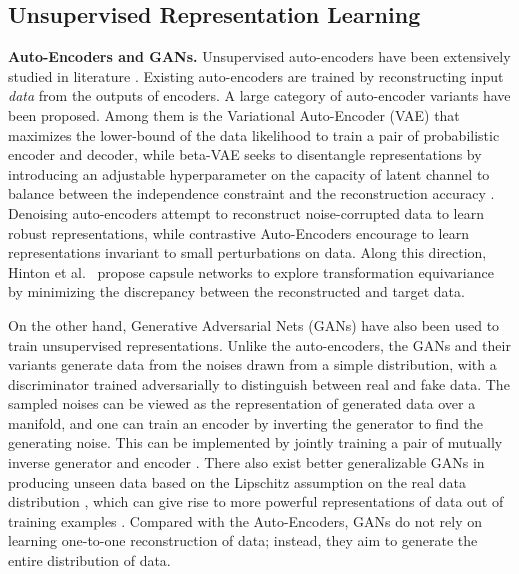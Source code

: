 \documentclass[10pt,journal,compsoc,twoside]{IEEEtran}
\begin{document}
\subsection{Unsupervised Representation Learning}
{\noindent \bf Auto-Encoders and GANs.}
Unsupervised auto-encoders have been extensively studied in literature \cite{hinton1994autoencoders,japkowicz2000nonlinear,vincent2008extracting}. Existing auto-encoders are trained by reconstructing input {\em data} from the outputs of encoders.
A large category of auto-encoder variants have been proposed.
Among them is the Variational Auto-Encoder (VAE) \cite{kingma2013auto} that maximizes the lower-bound of the data likelihood to train a pair of probabilistic encoder and decoder, while beta-VAE seeks to disentangle representations by introducing an adjustable hyperparameter on the capacity of latent channel to balance between the independence constraint and the reconstruction accuracy \cite{higgins2017beta}.  Denoising auto-encoders \cite{vincent2008extracting}
attempt to reconstruct noise-corrupted data to
learn robust representations, while
contrastive Auto-Encoders \cite{rifai2011contractive} encourage to learn representations invariant to small perturbations on data.
Along this direction, Hinton et al.~\cite{hinton2011transforming} propose capsule networks to explore transformation equivariance by minimizing the discrepancy between the reconstructed and target data.

On the other hand, Generative Adversarial Nets (GANs) have also been used to train unsupervised representations.  Unlike the auto-encoders, the GANs \cite{goodfellow2014generative} and their variants \cite{donahue2016adversarial,dumoulin2016adversarially,qi2017loss,arjovsky2017wasserstein} generate data from the noises drawn from a simple distribution, with a discriminator trained adversarially to distinguish between real and fake data. The sampled noises can be viewed as the representation of generated data over a manifold, and one can train an encoder by inverting the generator to find the generating noise. This can be implemented by jointly training a pair of mutually inverse generator and encoder \cite{donahue2016adversarial,dumoulin2016adversarially}. There also exist better generalizable GANs in producing unseen data based on the Lipschitz assumption on the real data distribution \cite{qi2017loss,arjovsky2017wasserstein}, which can give rise to more powerful representations of data out of training examples  \cite{donahue2016adversarial,dumoulin2016adversarially,edraki2018generalized}. Compared with the Auto-Encoders, GANs do not rely on learning one-to-one reconstruction of data; instead, they aim to generate the entire distribution of data.
\end{document}
